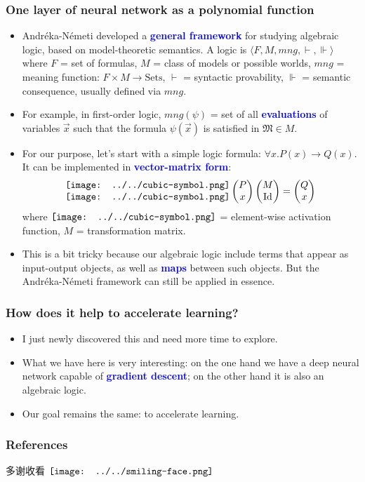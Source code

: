 \documentclass[16pt]{beamer}
\newcommand{\cc}[2]{#1}
\newcommand{\cc}[2]{#2}
\let\oldtextbf\textbf
\renewcommand{\textbf}[1]{\textcolor{blue}{\oldtextbf{#1}}}
\newcommand{\smiley}{$\vcenter{\hbox{\texttt{[image: ../../smiling-face.png]}}}$}
\newcommand{\cubic}{\vcenter{\hbox{\texttt{[image: ../../cubic-symbol.png]}}}}
\begin{document}
\begin{frame}
\frametitle{One layer of neural network as a polynomial function}
\fontsize{10pt}{8}\selectfont
\begin{itemize}
	\item Andr\'{e}ka-N\'{e}meti \cite{Andreka2021} developed a \textbf{general framework} for studying algebraic logic, based on model-theoretic semantics.  A logic is $\langle F, M, mng, \vdash, \Vdash \rangle$ where $F$ = set of formulas, $M$ = class of models or possible worlds, $mng$ = meaning function: $F \times M \rightarrow \mathrm{Sets}$, $\vdash$ = syntactic provability, $\Vdash$ = semantic consequence, usually defined via $mng$.
	
	\item For example, in first-order logic, $mng(\psi)$ = set of all \textbf{evaluations} of variables $\vec{x}$ such that the formula $\psi(\vec{x})$ is satisfied in $\mathfrak{M} \in M$.

	\item For our purpose, let's start with a simple logic formula: $\forall x. P(x) \rightarrow Q(x)$.  It can be implemented in \textbf{vector-matrix form}:
	\begin{gather}
	\begin{matrix} \cubic \\ \cubic \end{matrix}
	\begin{pmatrix} P \\ x \end{pmatrix}
	\begin{pmatrix} M \\ \mathrm{Id} \end{pmatrix}
	= \begin{pmatrix} Q \\ x \end{pmatrix}
	\nonumber
	\end{gather}
	where $\cubic$ = element-wise activation function, $M$ = transformation matrix.
	
	\item This is a bit tricky because our algebraic logic include terms that appear as input-output objects, as well as \textbf{maps} between such objects.  But the Andr\'{e}ka-N\'{e}meti framework can still be applied in essence.
\end{itemize}
\end{frame}

\begin{frame}
\frametitle{How does it help to accelerate learning?}
\begin{itemize}
	\item I just newly discovered this and need more time to explore.
	
	\item What we have here is very interesting: on the one hand we have a deep neural network capable of \textbf{gradient descent};  on the other hand it is also an algebraic logic.
	
	\item Our goal remains the same: to accelerate learning.  
\end{itemize}
\end{frame}

\begin{frame}
\frametitle{References}
\cc{多谢收看}{Thanks for watching} \smiley \\
\printbibliography
\end{frame}
\end{document}
